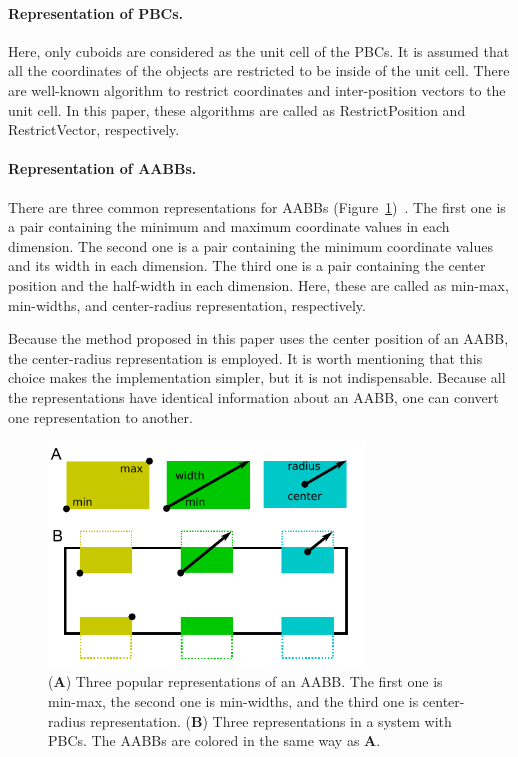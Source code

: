 \documentclass[10pt,letterpaper,twocolumn]{article}
\begin{document}
\paragraph{Representation of PBCs.}
Here, only cuboids are considered as the unit cell of the PBCs.
It is assumed that all the coordinates of the objects are restricted to be
inside of the unit cell.
There are well-known algorithm to restrict coordinates and inter-position
vectors to the unit cell.
In this paper, these algorithms are called as RestrictPosition and
RestrictVector, respectively.

\paragraph{Representation of AABBs.}
There are three common representations for AABBs
(Figure~\ref{fig-rectangle-rep})~\cite{real-time-collision-detection}.
The first one is a pair containing the minimum and maximum coordinate values
in each dimension.
The second one is a pair containing the minimum coordinate values and its width
in each dimension.
The third one is a pair containing the center position and the half-width
in each dimension.
Here, these are called as min-max, min-widths, and center-radius representation,
respectively.

Because the method proposed in this paper uses the center position of an AABB,
the center-radius representation is employed.
It is worth mentioning that this choice makes the implementation simpler,
but it is not indispensable.
Because all the representations have identical information about an AABB,
one can convert one representation to another.

\begin{figure}[thb]
    \includegraphics[width=8.4cm, bb=2 6 226 165]{fig-rect-rep.eps}
    \caption{
    (\textbf{A})
    Three popular representations of an AABB. The first one is min-max,
    the second one is min-widths, and the third one is center-radius representation.
    (\textbf{B})
    Three representations in a system with PBCs.
    The AABBs are colored in the same way as \textbf{A}.
    }
    \label{fig-rectangle-rep}
\end{figure}
\end{document}
